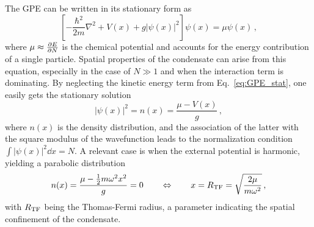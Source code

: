 The GPE can be written in its stationary form as
\begin{equation}
    \left[ 
        -\frac{\hbar^2}{2m}\nabla^2 + V(x) + g|\psi(x)|^2
    \right] \psi(x) = \mu \psi(x)\, ,
    \label{eq:GPE_stat}
\end{equation}
where $\mu \approx \pdv{E}{N}$ is the chemical potential and accounts for the energy contribution of a single particle. Spatial properties of the condensate can arise from this equation, especially in the case of $N \gg 1$ and when the interaction term is dominating. By neglecting the kinetic energy term from Eq.\ \eqref{eq:GPE_stat}, one easily gets the stationary solution
\[
    |\psi(x)|^2 = n(x) = \frac{\mu - V(x)}{g}\, ,
\]
where $n(x)$ is the density distribution, and the association of the latter with the square modulus of the wavefunction leads to the normalization condition $\int |\psi(x)|^2 \dd x = N$. A relevant case is when the external potential is harmonic, yielding a parabolic distribution
\begin{equation}
    n(x) = \frac{\mu - \frac{1}{2}m\omega^2x^2}{g} = 0 \qquad
    \Leftrightarrow \qquad
    x = R_{\rm TF} = \sqrt{\frac{2\mu}{m\omega^2}}\, ,
    \label{eq:TF}
\end{equation}
with $R_{\rm TF}$ being the Thomas-Fermi radius, a parameter indicating the spatial confinement of the condensate.



